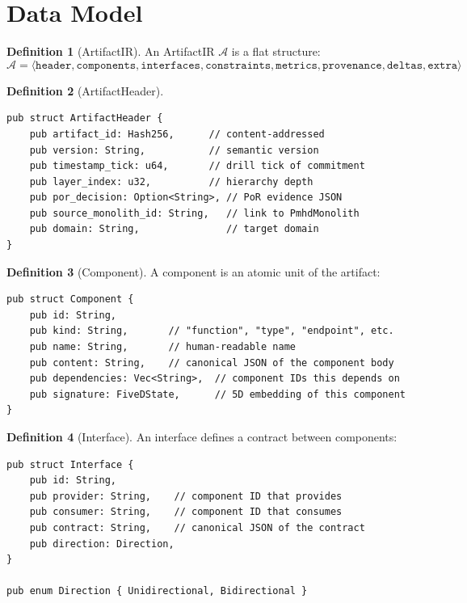 \documentclass[11pt,a4paper,twoside]{article}
\theoremstyle{definition}
\newtheorem{definition}{Definition}[section]
\theoremstyle{plain}
\theoremstyle{remark}
\newcommand{\calA}{\mathcal{A}}
\begin{document}
\section{Data Model}\label{sec:ir:model}

\begin{definition}[ArtifactIR]\label{def:artifactir}
An ArtifactIR $\calA$ is a flat structure:
\[
  \calA = \langle \mathtt{header}, \mathtt{components},
          \mathtt{interfaces}, \mathtt{constraints},
          \mathtt{metrics}, \mathtt{provenance},
          \mathtt{deltas}, \mathtt{extra} \rangle
\]
\end{definition}

\begin{definition}[ArtifactHeader]\label{def:artheader}
\begin{lstlisting}
pub struct ArtifactHeader {
    pub artifact_id: Hash256,      // content-addressed
    pub version: String,           // semantic version
    pub timestamp_tick: u64,       // drill tick of commitment
    pub layer_index: u32,          // hierarchy depth
    pub por_decision: Option<String>, // PoR evidence JSON
    pub source_monolith_id: String,   // link to PmhdMonolith
    pub domain: String,               // target domain
}
\end{lstlisting}
\end{definition}

\begin{definition}[Component]\label{def:component}
A component is an atomic unit of the artifact:
\begin{lstlisting}
pub struct Component {
    pub id: String,
    pub kind: String,       // "function", "type", "endpoint", etc.
    pub name: String,       // human-readable name
    pub content: String,    // canonical JSON of the component body
    pub dependencies: Vec<String>,  // component IDs this depends on
    pub signature: FiveDState,      // 5D embedding of this component
}
\end{lstlisting}
\end{definition}

\begin{definition}[Interface]\label{def:interface}
An interface defines a contract between components:
\begin{lstlisting}
pub struct Interface {
    pub id: String,
    pub provider: String,    // component ID that provides
    pub consumer: String,    // component ID that consumes
    pub contract: String,    // canonical JSON of the contract
    pub direction: Direction,
}

pub enum Direction { Unidirectional, Bidirectional }
\end{lstlisting}
\end{definition}
\end{document}
